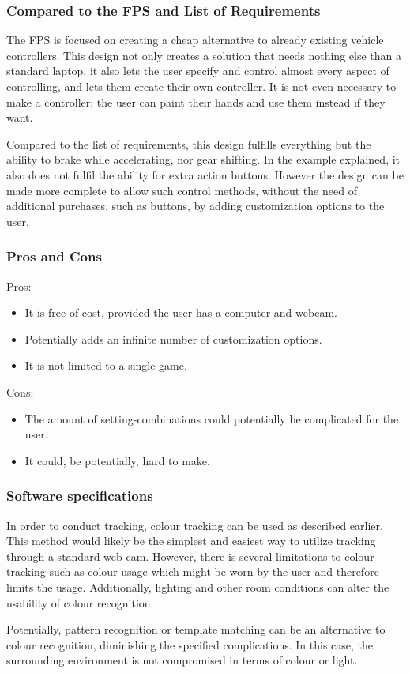 \subsubsection*{Compared to the FPS and List of Requirements}
The FPS is focused on creating a cheap alternative to already existing vehicle controllers. This design not only creates a solution that needs nothing else than a standard laptop, it also lets the user specify and control almost every aspect of controlling, and lets them create their own controller. It is not even necessary to make a controller; the user can paint their hands and use them instead if they want.

Compared to the list of requirements, this design fulfills everything but the ability to brake while accelerating, nor gear shifting. In the example explained, it also does not fulfil the ability for extra action buttons. However the design can be made more complete to allow such control methods, without the need of additional purchases, such as buttons, by adding customization options to the user.


\pagebreak[2]
\subsubsection*{Pros and Cons}
Pros:
\begin{itemize}
\item It is free of cost, provided the user has a computer and webcam.
\item Potentially adds an infinite number of customization options.
\item It is not limited to a single game.
\end{itemize}
Cons:
\begin{itemize}
\item The amount of setting-combinations could potentially be complicated for the user.
\item It could, be potentially, hard to make.
\end{itemize}

\subsubsection*{Software specifications}
In order to conduct tracking, colour tracking can be used as described earlier. This method would likely be the simplest and easiest way to utilize tracking through a standard web cam. However, there is several limitations to colour tracking such as colour usage which might be worn by the user and therefore limits the usage. Additionally, lighting and other room conditions can alter the usability of colour recognition.

Potentially, pattern recognition or template matching can be an alternative to colour recognition, diminishing the specified complications. In this case, the surrounding environment is not compromised in terms of colour or light.

